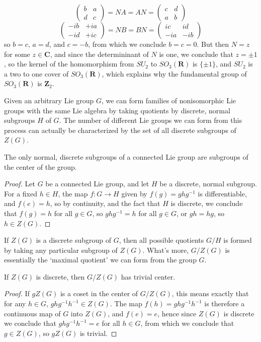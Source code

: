 \begin{example}
    \[ \begin{pmatrix} b & a \\ d & c \end{pmatrix} = NA = AN = \begin{pmatrix} c & d \\ a & b \end{pmatrix} \]
    \[ \begin{pmatrix} -ib & +ia \\ -id & +ic \end{pmatrix} = NB = BN = \begin{pmatrix} ic & id \\ -ia & -ib \end{pmatrix} \]
    so $b = c$, $a = d$, and $c = -b$, from which we conclude $b = c = 0$. But then $N = z$ for some $z \in \mathbf{C}$, and since the determininant of $N$ is one, we conclude that $z = \pm 1$, so the kernel of the homomorphism from $SU_2$ to $SO_3(\mathbf{R})$ is $\{ \pm 1 \}$, and $SU_2$ is a two to one cover of $SO_3(\mathbf{R})$, which explains why the fundamental group of $SO_3(\mathbf{R})$ is $\mathbf{Z}_2$.
\end{example}

Given an arbitrary Lie group $G$, we can form families of nonisomorphic Lie groups with the same Lie algebra by taking quotients by discrete, normal subgroups $H$ of $G$. The number of different Lie groups we can form from this process can actually be characterized by the set of all discrete subgroups of $Z(G)$.

\begin{theorem}
    The only normal, discrete subgroups of a connected Lie group are subgroups of the center of the group.
\end{theorem}
\begin{proof}
    Let $G$ be a connected Lie group, and let $H$ be a discrete, normal subgroup. For a fixed $h \in H$, the map $f: G \to H$ given by $f(g) = ghg^{-1}$ is differentiable, and $f(e) = h$, so by continuity, and the fact that $H$ is discrete, we conclude that $f(g) = h$ for all $g \in G$, so $ghg^{-1} = h$ for all $g \in G$, or $gh = hg$, so $h \in Z(G)$.
\end{proof}

If $Z(G)$ is a discrete subgroup of $G$, then all possible quotients $G/H$ is formed by taking any particular subgroup of $Z(G)$. What's more, $G/Z(G)$ is essentially the `maximal quotient' we can form from the group $G$.

\begin{theorem}
    If $Z(G)$ is discrete, then $G/Z(G)$ has trivial center.
\end{theorem}
\begin{proof}
    If $gZ(G)$ is a coset in the center of $G/Z(G)$, this means exactly that for any $h \in G$, $ghg^{-1}h^{-1} \in Z(G)$. The map $f(h) = ghg^{-1}h^{-1}$ is therefore a continuous map of $G$ into $Z(G)$, and $f(e) = e$, hence since $Z(G)$ is discrete we conclude that $ghg^{-1}h^{-1} = e$ for all $h \in G$, from which we conclude that $g \in Z(G)$, so $gZ(G)$ is trivial.
\end{proof}

